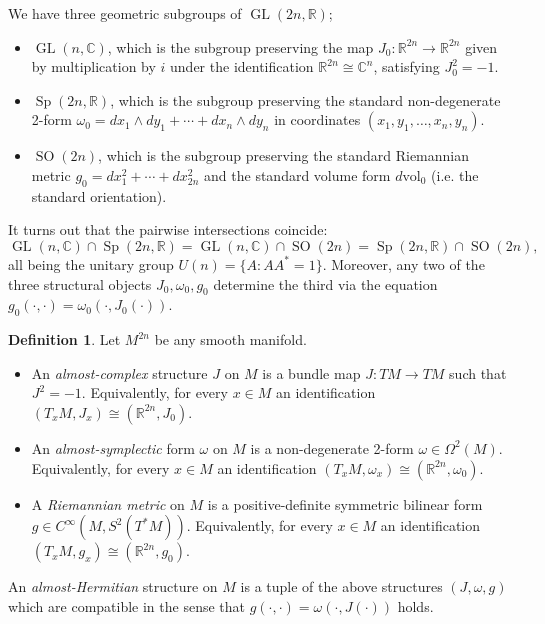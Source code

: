 \documentclass[a4paper]{article}
\theoremstyle{definition}
\newtheorem*{definition}{Definition}
\theoremstyle{remark}
\DeclareMathOperator{\Sp}{Sp}
\DeclareMathOperator{\SO}{SO}
\DeclareMathOperator{\GL}{GL}
\newcommand{\R}{\mathbb{R}}
\newcommand{\C}{\mathbb{C}}
\begin{document}
We have three geometric subgroups of $\GL(2n,\R)$;
\begin{itemize}
    \item $\GL(n,\C)$, which is the subgroup preserving the map
        $J_0:\R^{2n}\to\R^{2n}$ given by multiplication by $i$ under the
        identification $\R^{2n}\cong\C^n$, satisfying $J_0^2=-1$.

    \item $\Sp(2n,\R)$, which is the subgroup preserving the standard
        non-degenerate 2-form $\omega_0=dx_1\wedge dy_1+\cdots+dx_n\wedge dy_n$
        in coordinates $(x_1,y_1,\ldots,x_n,y_n)$.

    \item $\SO(2n)$, which is the subgroup preserving the standard Riemannian
        metric $g_0=dx_1^2+\cdots+dx_{2n}^2$ and the standard volume form
        $d\text{vol}_0$ (i.e. the standard orientation).
\end{itemize}
It turns out that the pairwise intersections coincide:
\begin{equation*}
    \GL(n,\C)\cap\Sp(2n,\R)
        = \GL(n,\C)\cap\SO(2n)
        = \Sp(2n,\R)\cap\SO(2n),
\end{equation*}
all being the unitary group $U(n)=\{A:AA^*=1\}$. Moreover, any two of the three
structural objects $J_0,\omega_0,g_0$ determine the third via the equation
$g_0(\cdot,\cdot)=\omega_0(\cdot,J_0(\cdot))$.

\begin{definition}
    Let $M^{2n}$ be any smooth manifold.
    \begin{itemize}
        \item An \emph{almost-complex} structure $J$ on $M$ is a bundle map
            $J:TM\to TM$ such that $J^2=-1$. Equivalently, for every $x\in M$ an
            identification $(T_xM,J_x)\cong(\R^{2n},J_0)$.

        \item An \emph{almost-symplectic} form $\omega$ on $M$ is a
            non-degenerate 2-form $\omega\in\Omega^2(M)$. Equivalently, for
            every $x\in M$ an identification
            $(T_xM,\omega_x)\cong(\R^{2n},\omega_0)$.

        \item A \emph{Riemannian metric} on $M$ is a positive-definite symmetric
            bilinear form $g\in C^\infty(M,S^2(T^*M))$. Equivalently, for every
            $x\in M$ an identification $(T_xM,g_x)\cong(\R^{2n},g_0)$.
    \end{itemize}
    An \emph{almost-Hermitian} structure on $M$ is a tuple of the above
    structures $(J,\omega,g)$ which are compatible in the sense that
    $g(\cdot,\cdot)=\omega(\cdot,J(\cdot))$ holds.
\end{definition}
\end{document}

